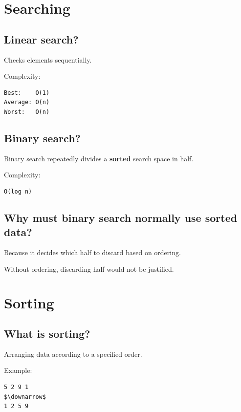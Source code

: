 \medskip

\section{Searching}

\subsection{Linear search?}

Checks elements sequentially.

Complexity:

\begin{lstlisting}
Best:    O(1)
Average: O(n)
Worst:   O(n)
\end{lstlisting}

\medskip

\subsection{Binary search?}

Binary search repeatedly divides a \textbf{sorted} search space in half.

Complexity:

\begin{lstlisting}
O(log n)
\end{lstlisting}

\medskip

\subsection{Why must binary search normally use sorted data?}

Because it decides which half to discard based on ordering.

Without ordering, discarding half would not be justified.

\medskip

\section{Sorting}

\subsection{What is sorting?}

Arranging data according to a specified order.

Example:

\begin{lstlisting}
5 2 9 1
$\downarrow$
1 2 5 9
\end{lstlisting}

